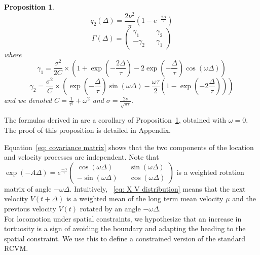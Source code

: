 \documentclass[aoas]{imsart}
\newtheorem{proposition}{Proposition}[section]
\theoremstyle{definition}
\theoremstyle{remark}
\theoremstyle{remark}
\newcommand {\1}{\mathbb{1}}
\begin{document}
\begin{proposition}
	\begin{equation*}
		q_2(\Delta)=\frac{2\nu^2}{\pi}\left(1-e^{-\frac{2 \Delta}{\tau}}\right)
	\end{equation*}
	\begin{equation*}\Gamma(\Delta)=\begin{pmatrix} \gamma_1 && \gamma_2 \\
			-\gamma_2 && \gamma_1\end{pmatrix}
	\end{equation*}
	where
	\begin{equation*}\gamma_1=\frac{\sigma^2}{2 C } \times \left( 1+\exp\left( -\frac{2\Delta}{\tau}\right)-2\exp\left( -\frac{\Delta}{\tau}\right) \cos(\omega\Delta)\right)
	\end{equation*}
	\begin{equation*}\gamma_2=\frac{\sigma^2}{C} \times\left( \exp\left( -\frac{\Delta}{\tau}\right) \sin(\omega \Delta)-\frac{\omega \tau}{2} \left(1-\exp\left( -2 \frac{\Delta}{\tau}\right) \right)\right)
	\end{equation*}
	and we denoted $C=\frac{1}{\tau^2}+\omega^2$ and $\sigma=\frac{2\nu}{\sqrt{\pi \tau}}$.
	\label{prop: transition density}
\end{proposition}

The formulas derived in \citep{johnson_continuous_2008} are a corollary of Proposition~\ref{prop: transition density}, obtained with $\omega=0$. The proof of this proposition is detailed in Appendix.

Equation~\eqref{eq: covariance matrix} shows that the two components of the location and velocity processes are independent.
Note that $\exp(-A\Delta)=e^{\frac{-\Delta}{\tau}} \begin{pmatrix} \cos(\omega \Delta) && \sin(\omega \Delta) \\ -\sin(\omega \Delta) && \cos(\omega \Delta) \end{pmatrix}$ is a weighted rotation matrix of angle $-\omega \Delta$.
Intuitively, ~\eqref{eq: X V distribution} means that the next velocity $V(t+\Delta)$ is a weighted mean of the long term mean velocity $\mu$ and the previous velocity $V(t)$ rotated by an angle $-\omega \Delta$.\\


For locomotion under spatial constraints, we hypothesize that an increase in tortuosity is a sign of avoiding the boundary and adapting the heading to the spatial constraint. We use this to define a constrained version of the standard RCVM.
\end{document}
